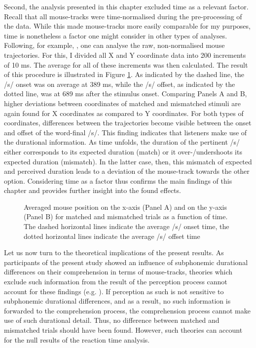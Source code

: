 Second, the analysis presented in this chapter excluded time as a relevant factor. Recall that all mouse-tracks were time-normalised during the pre-processing of the data. While this made mouse-tracks more easily comparable for my purposes, time is nonetheless a factor one might consider in other types of analyses. Following, for example, \citet{Blazej2015}, one can analyse the raw, non-normalised mouse trajectories. For this, I divided all X and Y coordinate data into 200 increments of 10 ms. The average for all of these increments was then calculated. The result of this procedure is illustrated in Figure \ref{fig:7_12}. As indicated by the dashed line, the /s/ onset was on average at 389 ms, while the /s/ offset, as indicated by the dotted line, was at 689 ms after the stimulus onset. Comparing Panels A and B, higher deviations between coordinates of matched and mismatched stimuli are again found for X coordinates as compared to Y coordinates. For both types of coordinates, differences between the trajectories become visible between the onset and offset of the word-final /s/. This finding indicates that listeners make use of the durational information. As time unfolds, the duration of the pertinent /s/ either corresponds to its expected duration (match) or it over-/undershoots its expected duration (mismatch). In the latter case, then, this mismatch of expected and perceived duration leads to a deviation of the mouse-track towards the other option. Considering time as a factor thus confirms the main findings of this chapter and provides further insight into the found effects.

\begin{figure}
    \centering
    
    \caption{Averaged mouse position on the x-axis (Panel A) and on the y-axis (Panel B) for matched and mismatched trials as a function of time. The dashed horizontal lines indicate the average /s/ onset time, the dotted horizontal lines indicate the average /s/ offset time}
    \label{fig:7_12}
\end{figure}

Let us now turn to the theoretical implications of the present results. As participants of the present study showed an influence of subphonemic durational differences on their comprehension in terms of mouse-tracks, theories which exclude such information from the result of the perception process cannot account for these findings (e.g. \cite{Klatt1979, McClelland1986, Norris1994, Norris2008}). If perception as such is not sensitive to subphonemic durational differences, and as a result, no such information is forwarded to the comprehension process, the comprehension process cannot make use of such durational detail. Thus, no difference between matched and mismatched trials should have been found. However, such theories can account for the null results of the reaction time analysis.


